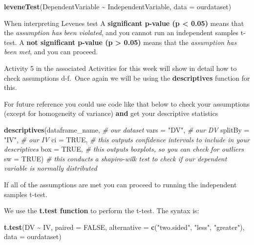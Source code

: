\documentclass[
]{book}
\newenvironment{Shaded}{\begin{snugshade}}{\end{snugshade}}
\newcommand{\AttributeTok}[1]{\textcolor[rgb]{0.13,0.29,0.53}{#1}}
\newcommand{\CommentTok}[1]{\textcolor[rgb]{0.56,0.35,0.01}{\textit{#1}}}
\newcommand{\ConstantTok}[1]{\textcolor[rgb]{0.56,0.35,0.01}{#1}}
\newcommand{\FunctionTok}[1]{\textcolor[rgb]{0.13,0.29,0.53}{\textbf{#1}}}
\newcommand{\NormalTok}[1]{#1}
\newcommand{\SpecialCharTok}[1]{\textcolor[rgb]{0.81,0.36,0.00}{\textbf{#1}}}
\newcommand{\StringTok}[1]{\textcolor[rgb]{0.31,0.60,0.02}{#1}}
\begin{document}
\begin{Shaded}
\begin{Highlighting}[]
\FunctionTok{leveneTest}\NormalTok{(DependentVariable }\SpecialCharTok{\textasciitilde{}}\NormalTok{ IndependentVariable, }\AttributeTok{data =}\NormalTok{ ourdataset)}
\end{Highlighting}
\end{Shaded}

When interpreting Levenes test A \textbf{significant p-value (p \textless{} 0.05)} means that the \emph{assumption has been violated}, and you cannot run an independent samples t-test. A \textbf{not significant p-value (p \textgreater{} 0.05)} means that the \emph{assumption has been met}, and you can proceed.

Activity 5 in the associated Activities for this week will show in detail how to check assumptions d-f.~Once again we will be using the \textbf{descriptives} function for this.

For future reference you could use code like that below to check your assumptions (except for homogeneity of variance) \textbf{and} get your descriptive statistics

\begin{Shaded}
\begin{Highlighting}[]
\FunctionTok{descriptives}\NormalTok{(dataframe\_name, }\CommentTok{\# our dataset}
             \AttributeTok{vars =} \StringTok{"DV"}\NormalTok{, }\CommentTok{\# our DV}
             \AttributeTok{splitBy =} \StringTok{"IV"}\NormalTok{, }\CommentTok{\# our IV}
             \AttributeTok{ci =} \ConstantTok{TRUE}\NormalTok{, }\CommentTok{\# this outputs confidence intervals to include in your descriptives}
             \AttributeTok{box =} \ConstantTok{TRUE}\NormalTok{, }\CommentTok{\# this outputs boxplots, so you can check for outliers}
             \AttributeTok{sw =} \ConstantTok{TRUE}\NormalTok{) }\CommentTok{\# this conducts a shapiro{-}wilk test to check if our dependent variable is normally distributed }
\end{Highlighting}
\end{Shaded}

If all of the assumptions are met you can proceed to running the independent samples t-test.

We use the \textbf{t.test function} to perform the t-test. The syntax is:

\begin{Shaded}
\begin{Highlighting}[]
\FunctionTok{t.test}\NormalTok{(DV }\SpecialCharTok{\textasciitilde{}}\NormalTok{ IV, }
       \AttributeTok{paired =} \ConstantTok{FALSE}\NormalTok{,}
       \AttributeTok{alternative =} \FunctionTok{c}\NormalTok{(}\StringTok{"two.sided"}\NormalTok{, }\StringTok{"less"}\NormalTok{, }\StringTok{"greater"}\NormalTok{),}
       \AttributeTok{data =}\NormalTok{ ourdataset)}
\end{Highlighting}
\end{Shaded}
\end{document}
